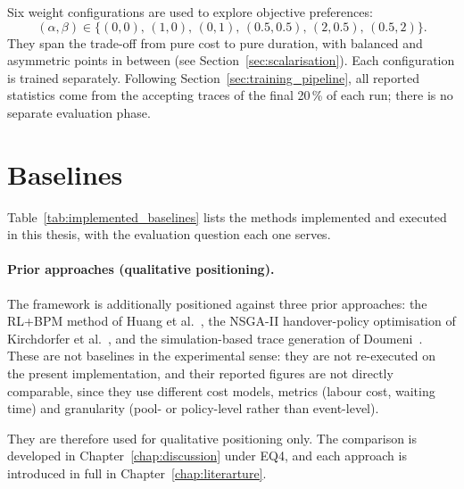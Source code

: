Six weight configurations are used to explore objective preferences:
\[
(\alpha,\beta) \in
\{(0,0),\,(1,0),\,(0,1),\,(0.5,0.5),\,(2,0.5),\,(0.5,2)\}.
\]
They span the trade-off from pure cost to pure duration, with balanced
and asymmetric points in between (see
Section~\ref{sec:scalarisation}). Each configuration is trained
separately. Following Section~\ref{sec:training_pipeline}, all reported
statistics come from the accepting traces of the final 20\,\% of each
run; there is no separate evaluation phase.

\section{Baselines}
\label{sec:baselines}

Table~\ref{tab:implemented_baselines} lists the methods implemented and
executed in this thesis, with the evaluation question each one serves.

\paragraph{Prior approaches (qualitative positioning).}
The framework is additionally positioned against three prior approaches:
the \ac{RL}+\ac{BPM} method of Huang et
al.~\cite{Huang2011ReinforcementManagement}, the NSGA-II
handover-policy optimisation of Kirchdorfer et
al.~\cite{KirchdorferLukasFromPolicies}, and the simulation-based trace
generation of Doumeni~\cite{ArtemisDoumeniParetoAgentSimulator}. These
are not baselines in the experimental sense: they are not re-executed on
the present implementation, and their reported figures are not directly
comparable, since they use different cost models, metrics (labour cost,
waiting time) and granularity (pool- or policy-level rather than
event-level).

They are therefore used for qualitative positioning only.
The comparison is developed in Chapter~\ref{chap:discussion} under EQ4,
and each approach is introduced in full in
Chapter~\ref{chap:literarture}.

